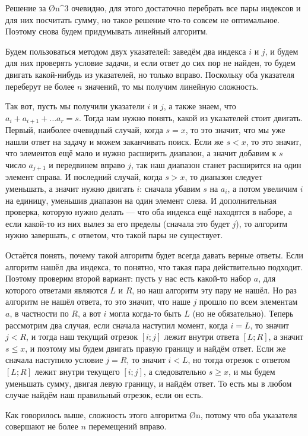 Решение за \O{n^3} очевидно, для этого достаточно перебрать все пары индексов и для них посчитать сумму, но такое решение что-то совсем не оптимальное. Поэтому снова будем придумывать линейный алгоритм.

Будем пользоваться методом двух указателей: заведём два индекса $i$ и $j$, и будем для них проверять условие задачи, и если ответ до сих пор не найден, то будем двигать какой-нибудь из указателей, но только вправо. Поскольку оба указателя переберут не более $n$ значений, то мы получим линейную сложность.

Так вот, пусть мы получили указатели $i$ и $j$, а также знаем, что $a_i + a_{i + 1} + \ldots a_r = s$. Тогда нам нужно понять, какой из указателей стоит двигать. Первый, наиболее очевидный случай, когда $s = x$, то это значит, что мы уже нашли ответ на задачу и можем заканчивать поиск. Если же $s < x$, то это значит, что элементов ещё мало и нужно расширить диапазон, а значит добавим к $s$ число $a_{j + 1}$ и передвинем вправо $j$, так наш диапазон станет расширится на один элемент справа. И последний случай, когда $s > x$, то диапазон следует уменьшать, а значит нужно двигать $i$: сначала убавим $s$ на $a_i$, а потом увеличим $i$ на единицу, уменьшив диапазон на один элемент слева. И дополнительная проверка, которую нужно делать — что оба индекса ещё находятся в наборе, а если какой-то из них вылез за его пределы (сначала это будет $j$), то алгоритм нужно завершать, с ответом, что такой пары не существует.

Остаётся понять, почему такой алгоритм будет всегда давать верные ответы. Если алгоритм нашёл два индекса, то понятно, что такая пара действительно подходит. Поэтому проверим второй вариант: пусть у нас есть какой-то набор $a$, для которого ответами являются $L$ и $R$, но наш алгоритм эту пару не нашёл. Но раз алгоритм не нашёл ответа, то это значит, что наше $j$ прошло по всем элементам $a$, в частности по $R$, а вот $i$ могла когда-то быть $L$ (но не обязательно). Теперь рассмотрим два случая, если сначала наступил момент, когда $i = L$, то значит $j < R$, и тогда наш текущий отрезок $[i; j]$ лежит внутри ответа $[L; R]$, а значит $s \leq x$, и поэтому мы будем двигать правую границу и найдём ответ. Если же сначала наступило условие $j = R$, то значит $i < L$, но тогда отрезок с ответом $[L; R]$ лежит внутри текущего $[i; j]$, а следовательно $s \geq x$, и мы будем уменьшать сумму, двигая левую границу, и найдём ответ. То есть мы в любом случае найдём наш правильный отрезок, если он есть.

Как говорилось выше, сложность этого алгоритма \O{n}, потому что оба указателя совершают не более $n$ перемещений вправо.
